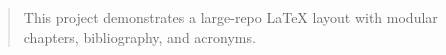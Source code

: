 \maketitle
\begin{abstract}
This project demonstrates a large-repo LaTeX layout with modular chapters, bibliography, and acronyms.
\end{abstract}
